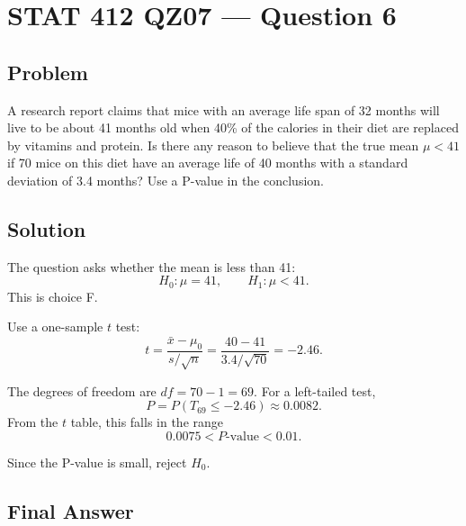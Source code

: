 \documentclass[11pt]{article}
\begin{document}
\section*{STAT 412 QZ07 --- Question 6}

\subsection*{Problem}

A research report claims that mice with an average life span of 32 months will live to be about 41 months old when 40\% of the calories in their diet are replaced by vitamins and protein. Is there any reason to believe that the true mean $\mu<41$ if 70 mice on this diet have an average life of 40 months with a standard deviation of 3.4 months? Use a P-value in the conclusion.

\subsection*{Solution}

The question asks whether the mean is less than 41:
\[
H_0:\mu=41,\qquad H_1:\mu<41.
\]
This is choice F.

Use a one-sample $t$ test:
\[
t=\frac{\bar{x}-\mu_0}{s/\sqrt{n}}
=\frac{40-41}{3.4/\sqrt{70}}
=-2.46.
\]

The degrees of freedom are $df=70-1=69$. For a left-tailed test,
\[
P=P(T_{69}\le -2.46)\approx 0.0082.
\]
From the $t$ table, this falls in the range
\[
0.0075<P\text{-value}<0.01.
\]

Since the P-value is small, reject $H_0$.

\subsection*{Final Answer}

\end{document}
